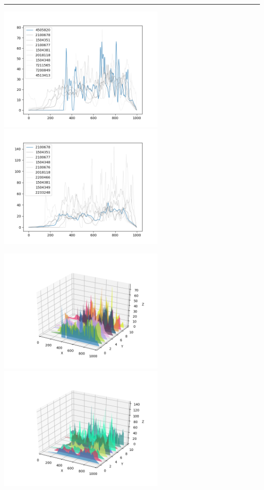 \documentclass{article}
\begin{document}
\begin{center}
\noindent\rule{\textwidth}{1pt}

\includegraphics[height=6cm, width=8cm]{9.png}\includegraphics[height=6cm, width=8cm]{9_cos.png}

\includegraphics[height=6cm, width=8cm]{9_3d.png} \includegraphics[height=6cm, width=8cm]{9_cos_3d.png}


\end{center}
\end{document}

